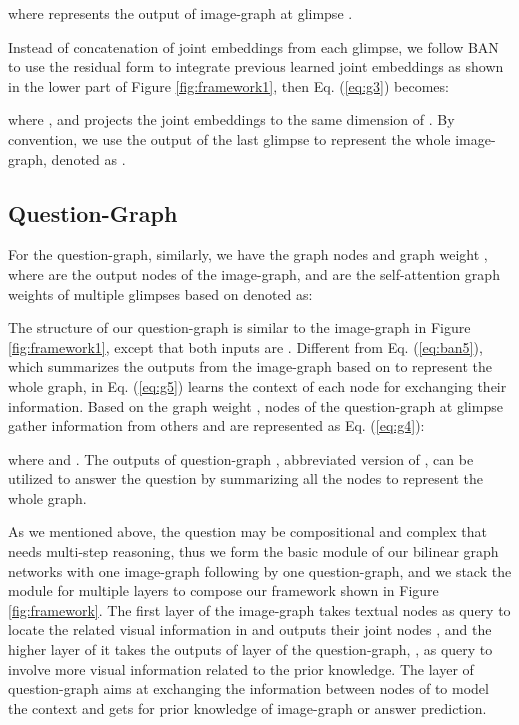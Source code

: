 \documentclass[10pt,twocolumn,letterpaper]{article}
\begin{document}
where  represents the output of image-graph at glimpse .

Instead of concatenation \cite{vaswani2017attention, devlin2018bert, velickovic2017graph} of joint embeddings from each glimpse, we follow BAN to use the residual form to integrate previous learned joint embeddings as shown in the lower part of Figure \ref{fig:framework1}, then Eq. (\ref{eq:g3}) becomes:
\vspace{-5pt}

where , and  projects the joint embeddings to the same dimension of . By convention, we use the output of the last glimpse to represent the whole image-graph, denoted as .

\subsection{Question-Graph}
For the question-graph, similarly, we have the graph nodes  and graph weight , where  are the output nodes of the image-graph, and  are the self-attention graph weights of multiple glimpses based on  denoted as:
\vspace{-5pt}
{\small

}
The structure of our question-graph is similar to the image-graph in Figure \ref{fig:framework1}, except that both inputs are . Different from Eq. (\ref{eq:ban5}), which summarizes the outputs from the image-graph based on  to represent the whole graph,  in Eq. (\ref{eq:g5}) learns the context of each node for exchanging their information. Based on the graph weight , nodes of the question-graph at glimpse  gather information from others and are represented as Eq. (\ref{eq:g4}):
\vspace{-5pt}

where  and . The outputs of question-graph , abbreviated version of , can be utilized to answer the question by summarizing all the nodes to represent the whole graph.

As we mentioned above, the question may be compositional and complex that needs multi-step reasoning, thus we form the basic module of our bilinear graph networks with one image-graph following by one question-graph, and we stack the module for multiple layers to compose our framework shown in Figure \ref{fig:framework}. The first layer of the image-graph takes textual nodes  as query to locate the related visual information in  and outputs their joint nodes , and the higher layer of it takes the outputs of  layer of the question-graph, , as query to involve more visual information related to the prior knowledge. The layer  of question-graph aims at exchanging the information between nodes of  to model the context and gets  for prior knowledge of image-graph or answer prediction.
\end{document}
